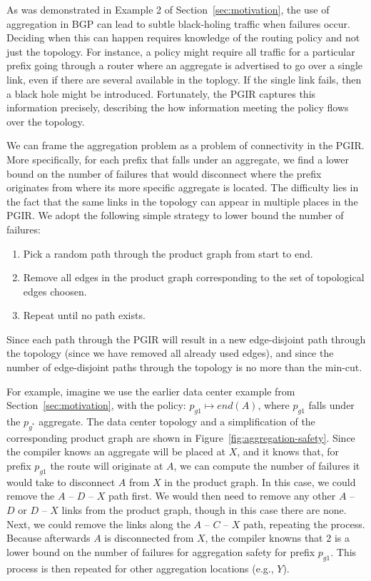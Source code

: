 As was demonstrated in Example 2 of Section~\ref{sec:motivation}, the use of aggregation in BGP can lead to subtle black-holing traffic when failures occur. Deciding when this can happen requires knowledge of the routing policy and not just the topology. For instance, a policy might require all traffic for a particular prefix going through a router where an aggregate is advertised to go over a single link, even if there are several available in the toplogy. If the single link fails, then a black hole might be introduced. Fortunately, the PGIR captures this information precisely, describing the how information meeting the policy flows over the topology. 

We can frame the aggregation problem as a problem of connectivity in the PGIR. More specifically, for each prefix that falls under an aggregate, we find a lower bound on the number of failures that would disconnect where the prefix originates from where its more specific aggregate is located. The difficulty lies in the fact that the same links in the topology can appear in multiple places in the PGIR. We adopt the following simple strategy to lower bound the number of failures:
\begin{enumerate}
	\item Pick a random path through the product graph from start to end.
	\item Remove all edges in the product graph corresponding to the set of topological edges choosen.
	\item Repeat until no path exists.
\end{enumerate}
Since each path through the PGIR will result in a new edge-disjoint path through the topology (since we have removed all already used edges), and since the number of edge-disjoint paths through the topology is no more than the min-cut. 

For example, imagine we use the earlier data center example from Section~\ref{sec:motivation}, with the policy: $p_{g1} \mapsto end(A)$, where $p_{g1}$ falls under the $p_{g^*}$ aggregate. The data center topology and a simplification of the corresponding product graph are shown in Figure~\ref{fig:aggregation-safety}. Since the compiler knows an aggregate will be placed at $X$, and it knows that, for prefix $p_{g1}$ the route will originate at $A$, we can compute the number of failures it would take to disconnect $A$ from $X$ in the product graph. In this case, we could remove the $A$ -- $D$ -- $X$ path first. We would then need to remove any other $A$ -- $D$ or $D$ -- $X$ links from the product graph, though in this case there are none. Next, we could remove the links along the $A$ -- $C$ -- $X$ path, repeating the process. Because afterwards $A$ is disconnected from $X$, the compiler knowns that 2 is a lower bound on the number of failures for aggregation safety for prefix $p_{g1}$. This process is then repeated for other aggregation locations (e.g., $Y$).


